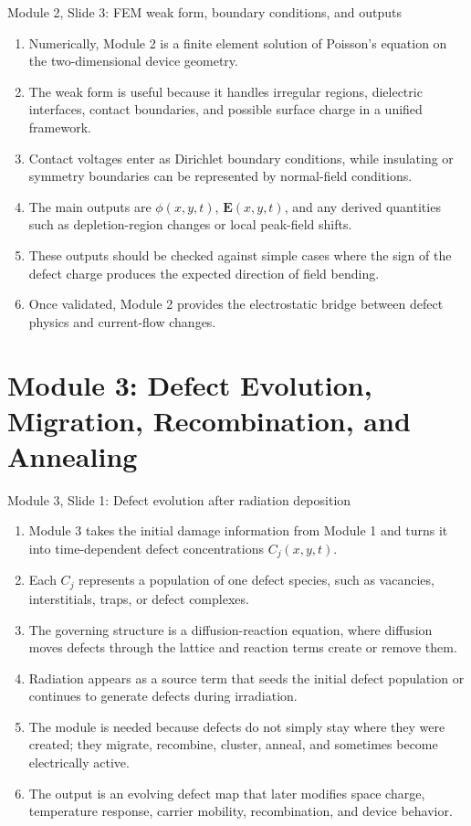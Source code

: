 \documentclass[11pt]{article}
\newcommand{\Evec}{\bm{E}}
\begin{document}
\begin{slidebox}{Module 2, Slide 3: FEM weak form, boundary conditions, and outputs}
\begin{enumerate}
\item Numerically, Module 2 is a finite element solution of Poisson's equation on the two-dimensional device geometry.
\item The weak form is useful because it handles irregular regions, dielectric interfaces, contact boundaries, and possible surface charge in a unified framework.
\item Contact voltages enter as Dirichlet boundary conditions, while insulating or symmetry boundaries can be represented by normal-field conditions.
\item The main outputs are \(\phi(x,y,t)\), \(\Evec(x,y,t)\), and any derived quantities such as depletion-region changes or local peak-field shifts.
\item These outputs should be checked against simple cases where the sign of the defect charge produces the expected direction of field bending.
\item Once validated, Module 2 provides the electrostatic bridge between defect physics and current-flow changes.
\end{enumerate}
\end{slidebox}

\section{Module 3: Defect Evolution, Migration, Recombination, and Annealing}

\begin{slidebox}{Module 3, Slide 1: Defect evolution after radiation deposition}
\begin{enumerate}
\item Module 3 takes the initial damage information from Module 1 and turns it into time-dependent defect concentrations \(C_j(x,y,t)\).
\item Each \(C_j\) represents a population of one defect species, such as vacancies, interstitials, traps, or defect complexes.
\item The governing structure is a diffusion-reaction equation, where diffusion moves defects through the lattice and reaction terms create or remove them.
\item Radiation appears as a source term that seeds the initial defect population or continues to generate defects during irradiation.
\item The module is needed because defects do not simply stay where they were created; they migrate, recombine, cluster, anneal, and sometimes become electrically active.
\item The output is an evolving defect map that later modifies space charge, temperature response, carrier mobility, recombination, and device behavior.
\end{enumerate}
\end{slidebox}
\end{document}

